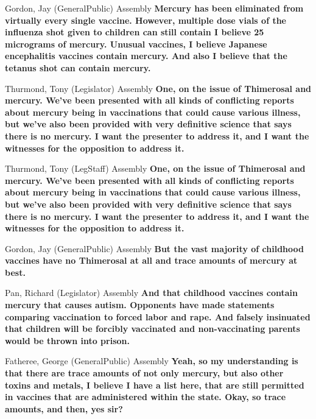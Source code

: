 \begin{result}{10.52969463970219}{Gordon, Jay (GeneralPublic) Assembly}
\textbf{Mercury has been eliminated from virtually every single vaccine. However, multiple dose vials of the influenza shot given to children can still contain I believe 25 micrograms of mercury. Unusual vaccines, I believe Japanese encephalitis vaccines contain mercury. And also I believe that the tetanus shot can contain mercury.
}\end{result}

\begin{result}{9.274900297575922}{Thurmond, Tony (Legislator) Assembly}
\textbf{One, on the issue of Thimerosal and mercury. We've been presented with all kinds of conflicting reports about mercury being in vaccinations that could cause various illness, but we've also been provided with very definitive science that says there is no mercury. I want the presenter to address it, and I want the witnesses for the opposition to address it.
}\end{result}

\begin{result}{9.274900297575922}{Thurmond, Tony (LegStaff) Assembly}
\textbf{One, on the issue of Thimerosal and mercury. We've been presented with all kinds of conflicting reports about mercury being in vaccinations that could cause various illness, but we've also been provided with very definitive science that says there is no mercury. I want the presenter to address it, and I want the witnesses for the opposition to address it.
}\end{result}

\begin{result}{8.845314169917447}{Gordon, Jay (GeneralPublic) Assembly}
\textbf{But the vast majority of childhood vaccines have no Thimerosal at all and trace amounts of mercury at best.
}\end{result}

\begin{result}{7.142469003727607}{Pan, Richard (Legislator) Assembly}
\textbf{And that childhood vaccines contain mercury that causes autism. Opponents have made statements comparing vaccination to forced labor and rape. And falsely insinuated that children will be forcibly vaccinated and non-vaccinating parents would be thrown into prison.
}\end{result}

\begin{result}{7.031493570191112}{Fatheree, George (GeneralPublic) Assembly}
\textbf{Yeah, so my understanding is that there are trace amounts of not only mercury, but also other toxins and metals, I believe I have a list here, that are still permitted in vaccines that are administered within the state. Okay, so trace amounts, and then, yes sir?
}\end{result}

